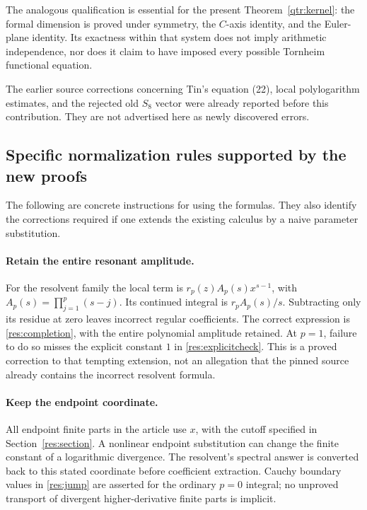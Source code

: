 \documentclass[11pt,a4paper]{article}
\numberwithin{equation}{section}
\theoremstyle{definition}
\theoremstyle{remark}
\begin{document}
The analogous qualification is essential for the present
Theorem~\ref{qtr:kernel}: the formal dimension is proved under
symmetry, the $C$-axis identity, and the Euler-plane identity.
Its exactness within that system does not imply arithmetic
independence, nor does it claim to have imposed every possible
Tornheim functional equation.

The earlier source corrections concerning Tin's equation (22),
local polylogarithm estimates, and the rejected old $S_8$ vector
were already reported before this contribution. They are not
advertised here as newly discovered errors.

\subsection{Specific normalization rules supported by the new proofs}

The following are concrete instructions for using the formulas.
They also identify the corrections required if one extends the
existing calculus by a naive parameter substitution.

\paragraph{Retain the entire resonant amplitude.}
For the resolvent family the local term is
$r_p(z)A_p(s)x^{s-1}$, with
$A_p(s)=\prod_{j=1}^p(s-j)$. Its continued integral is
$r_pA_p(s)/s$. Subtracting only its residue at zero leaves
incorrect regular coefficients. The correct expression is
\eqref{res:completion}, with the entire polynomial amplitude
retained. At $p=1$, failure to do so misses the explicit constant
$1$ in \eqref{res:explicitcheck}. This is a proved correction
to that tempting extension, not an allegation that the pinned
source already contains the incorrect resolvent formula.

\paragraph{Keep the endpoint coordinate.}
All endpoint finite parts in the article use $x$, with the
cutoff specified in Section~\ref{res:section}. A nonlinear
endpoint substitution can change the finite constant of a
logarithmic divergence. The resolvent's spectral answer is
converted back to this stated coordinate before coefficient
extraction. Cauchy boundary values in \eqref{res:jump} are
asserted for the ordinary $p=0$ integral; no unproved transport
of divergent higher-derivative finite parts is implicit.
\end{document}
